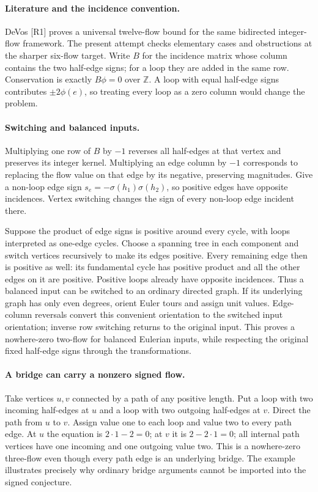 \documentclass[11pt,a4paper]{article}
\begin{document}
\paragraph{Literature and the incidence convention.}
DeVos [R1] proves a universal twelve-flow bound for the same bidirected
integer-flow framework. The present attempt checks elementary cases and
obstructions at the sharper six-flow target. Write $B$ for the incidence
matrix whose column contains the two half-edge signs; for a loop they
are added in the same row. Conservation is exactly $B\phi=0$ over
$\mathbb Z$. A loop with equal half-edge signs contributes $\pm2\phi(e)$,
so treating every loop as a zero column would change the problem.

\paragraph{Switching and balanced inputs.}
Multiplying one row of $B$ by $-1$ reverses all half-edges at that vertex
and preserves its integer kernel. Multiplying an edge column by $-1$
corresponds to replacing the flow value on that edge by its negative,
preserving magnitudes. Give a non-loop edge sign
$s_e=-\sigma(h_1)\sigma(h_2)$, so positive edges have opposite incidences.
Vertex switching changes the sign of every non-loop edge incident there.

Suppose the product of edge signs is positive around every cycle, with
loops interpreted as one-edge cycles. Choose a spanning tree in each
component and switch vertices recursively to make its edges positive.
Every remaining edge then is positive as well: its fundamental cycle
has positive product and all the other edges on it are positive.
Positive loops already have opposite incidences. Thus a balanced input
can be switched to an ordinary directed graph. If its underlying graph
has only even degrees, orient Euler tours and assign unit values.
Edge-column reversals convert this convenient orientation to the switched
input orientation; inverse row switching returns to the original input.
This proves a nowhere-zero two-flow for balanced Eulerian inputs, while
respecting the original fixed half-edge signs through the transformations.

\paragraph{A bridge can carry a nonzero signed flow.}
Take vertices $u,v$ connected by a path of any positive length. Put a
loop with two incoming half-edges at $u$ and a loop with two outgoing
half-edges at $v$. Direct the path from $u$ to $v$. Assign value one
to each loop and value two to every path edge. At $u$ the equation is
$2\cdot1-2=0$; at $v$ it is $2-2\cdot1=0$; all internal path vertices
have one incoming and one outgoing value two. This is a nowhere-zero
three-flow even though every path edge is an underlying bridge. The
example illustrates precisely why ordinary bridge arguments cannot be
imported into the signed conjecture.
\end{document}
